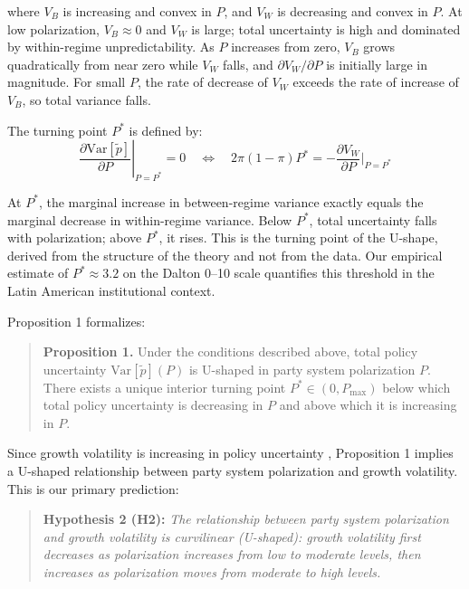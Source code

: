 \documentclass[12pt]{article}
\begin{document}
\noindent where $V_B$ is increasing and convex in $P$, and $V_W$ is
decreasing and convex in $P$. At low polarization, $V_B \approx 0$ and
$V_W$ is large; total uncertainty is high and dominated by within-regime
unpredictability. As $P$ increases from zero, $V_B$ grows quadratically
from near zero while $V_W$ falls, and $\partial V_W / \partial P$ is
initially large in magnitude. For small $P$, the rate of decrease of
$V_W$ exceeds the rate of increase of $V_B$, so total variance falls.

The turning point $P^*$ is defined by:
\begin{equation}
\label{eq:turning}
\left.\frac{\partial \text{Var}[\tilde{p}]}{\partial P}\right|_{P=P^*} = 0
\quad\Longleftrightarrow\quad
2\pi(1-\pi)P^* = -\frac{\partial V_W}{\partial P}\bigg|_{P=P^*}
\end{equation}

\noindent At $P^*$, the marginal increase in between-regime variance exactly
equals the marginal decrease in within-regime variance. Below $P^*$, total
uncertainty falls with polarization; above $P^*$, it rises. This is the
turning point of the U-shape, derived from the structure of the theory and
not from the data. Our empirical estimate of $P^* \approx 3.2$ on the
Dalton 0--10 scale quantifies this threshold in the Latin American
institutional context.

Proposition 1 formalizes:

\begin{quote}
\textbf{Proposition 1.} Under the conditions described above, total policy
uncertainty $\text{Var}[\tilde{p}](P)$ is U-shaped in party system
polarization $P$. There exists a unique interior turning point $P^* \in
(0, P_{\max})$ below which total policy uncertainty is decreasing in $P$
and above which it is increasing in $P$.
\end{quote}

\noindent Since growth volatility is increasing in policy uncertainty
\citep{BejarMukherjee2011, Fatás2003, Baker2016, FernandezVillaverde2015},
Proposition 1 implies a
U-shaped relationship between party system polarization and growth volatility.
This is our primary prediction:

\begin{quote}
\textbf{Hypothesis 2 (H2):} \textit{The relationship between party system
polarization and growth volatility is curvilinear (U-shaped): growth
volatility first decreases as polarization increases from low to moderate
levels, then increases as polarization moves from moderate to high levels.}
\end{quote}
\end{document}
